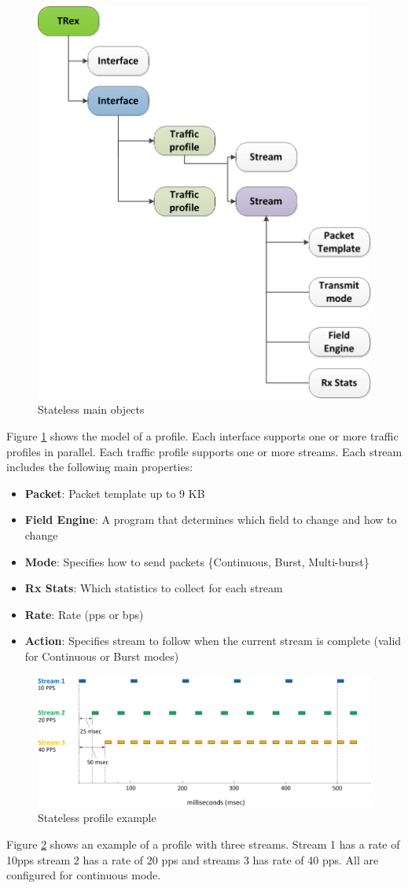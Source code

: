 \documentclass[letterpaper]{article}
\begin{document}
\begin{figure}[h]
\includegraphics[width=0.25
\textwidth, center]{stateless_objects_02.png}
\caption{Stateless main objects}
\label{fig:stlobjects}
\end{figure}

Figure \ref{fig:stlobjects} shows the model of a profile. Each interface supports one or more traffic profiles in parallel.
Each traffic profile supports one or more streams. Each stream includes the following main properties:

\begin{itemize}
\item \textbf{Packet}: Packet template up to 9 KB
\item \textbf{Field Engine}: A program that determines which field to change and how to change 
\item \textbf{Mode}: Specifies how to send packets \{Continuous, Burst, Multi-burst\}
\item \textbf{Rx Stats}: Which statistics to collect for each stream
\item \textbf{Rate}: Rate (pps or bps) 
\item \textbf{Action}: Specifies stream to follow when the current stream is complete (valid for Continuous or Burst modes)
\end{itemize}

\begin{figure}[h]
\includegraphics[width=0.4
\textwidth, center]{stl_interleaving_01.png}
\caption{Stateless profile example}
\label{fig:stlhello}
\end{figure}

Figure \ref{fig:stlhello} shows an example of a profile with three streams.  
Stream 1 has a rate of 10pps stream 2 has a rate of 20 pps and streams 3 has rate of 40 pps. All are configured for continuous mode.
\end{document}
